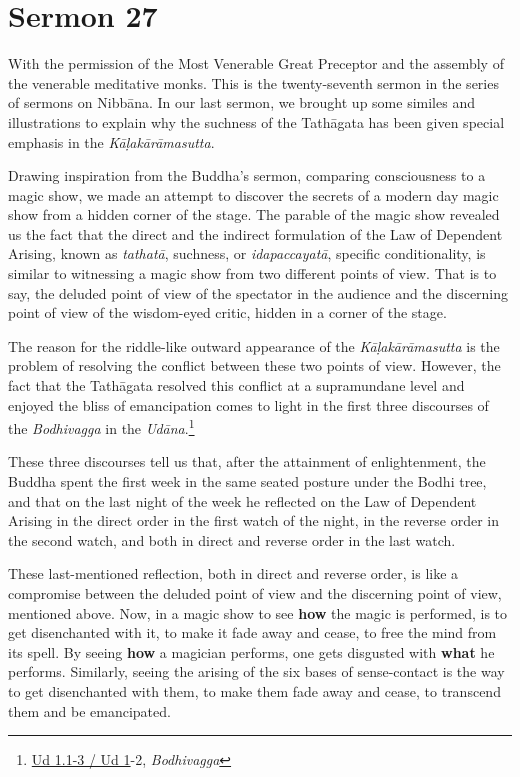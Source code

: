 \chapter{Sermon 27}

\NibbanaOpeningQuote

With the permission of the Most Venerable Great Preceptor and the assembly of the venerable meditative monks. This is the twenty-seventh sermon in the series of sermons on Nibbāna. In our last sermon, we brought up some similes and illustrations to explain why the suchness of the Tathāgata has been given special emphasis in the \emph{Kāḷakārāmasutta}.

Drawing inspiration from the Buddha's sermon, comparing consciousness to a magic show, we made an attempt to discover the secrets of a modern day magic show from a hidden corner of the stage. The parable of the magic show revealed us the fact that the direct and the indirect formulation of the Law of Dependent Arising, known as \emph{tathatā}, suchness, or \emph{idapaccayatā}, specific conditionality, is similar to witnessing a magic show from two different points of view. That is to say, the deluded point of view of the spectator in the audience and the discerning point of view of the wisdom-eyed critic, hidden in a corner of the stage.

\clearpage

The reason for the riddle-like outward appearance of the \emph{Kāḷakārāmasutta} is the problem of resolving the conflict between these two points of view. However, the fact that the Tathāgata resolved this conflict at a supramundane level and enjoyed the bliss of emancipation comes to light in the first three discourses of the \emph{Bodhivagga} in the \emph{Udāna}.\footnote{\href{https://suttacentral.net/ud1.1/pli/ms}{Ud 1.1-3 / Ud 1}-2, \emph{Bodhivagga}}

These three discourses tell us that, after the attainment of enlightenment, the Buddha spent the first week in the same seated posture under the Bodhi tree, and that on the last night of the week he reflected on the Law of Dependent Arising in the direct order in the first watch of the night, in the reverse order in the second watch, and both in direct and reverse order in the last watch.

These last-mentioned reflection, both in direct and reverse order, is like a compromise between the deluded point of view and the discerning point of view, mentioned above. Now, in a magic show to see \textbf{how} the magic is performed, is to get disenchanted with it, to make it fade away and cease, to free the mind from its spell. By seeing \textbf{how} a magician performs, one gets disgusted with \textbf{what} he performs. Similarly, seeing the arising of the six bases of sense-contact is the way to get disenchanted with them, to make them fade away and cease, to transcend them and be emancipated.

